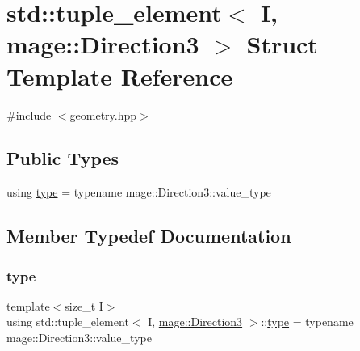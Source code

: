 \hypertarget{structstd_1_1tuple__element_3_01_i_00_01mage_1_1_direction3_01_4}{}\section{std\+:\+:tuple\+\_\+element$<$ I, mage\+:\+:Direction3 $>$ Struct Template Reference}
\label{structstd_1_1tuple__element_3_01_i_00_01mage_1_1_direction3_01_4}


{\ttfamily \#include $<$geometry.\+hpp$>$}

\subsection*{Public Types}
\begin{DoxyCompactItemize}
\item 
using \mbox{\hyperlink{structstd_1_1tuple__element_3_01_i_00_01mage_1_1_direction3_01_4_aba7f84e28b059beb0df838e74194efba}{type}} = typename mage\+::\+Direction3\+::value\+\_\+type
\end{DoxyCompactItemize}


\subsection{Member Typedef Documentation}
\mbox{\label{structstd_1_1tuple__element_3_01_i_00_01mage_1_1_direction3_01_4_aba7f84e28b059beb0df838e74194efba}} 
\subsubsection{\texorpdfstring{type}{type}}
{\footnotesize\ttfamily template$<$size\+\_\+t I$>$ \\
using std\+::tuple\+\_\+element$<$ I, \mbox{\hyperlink{structmage_1_1_direction3}{mage\+::\+Direction3}} $>$\+::\mbox{\hyperlink{structstd_1_1tuple__element_3_01_i_00_01mage_1_1_direction3_01_4_aba7f84e28b059beb0df838e74194efba}{type}} =  typename mage\+::\+Direction3\+::value\+\_\+type}

